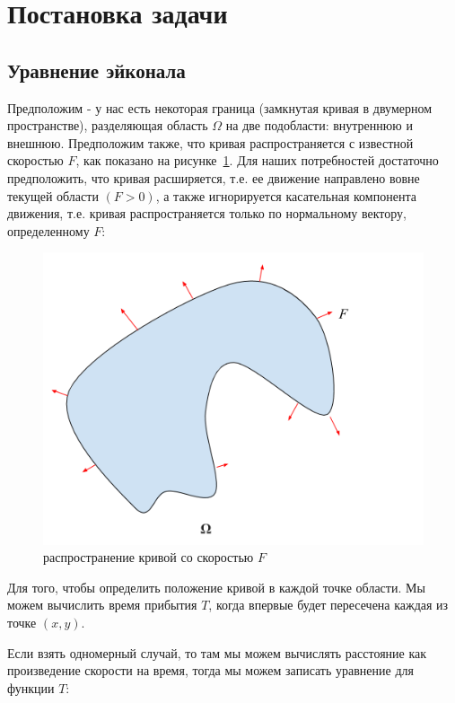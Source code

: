\section{Постановка задачи}
\label{sec:theory}

\subsection {Уравнение эйконала}
\label{sec:csdisttrack}

Предположим - у нас есть некоторая граница (замкнутая кривая в
двумерном пространстве), разделяющая область $\Omega$ на две подобласти:
внутреннюю и внешнюю. Предположим также, что кривая распространяется с
известной скоростью $F$, как показано на рисунке~\ref{fig:eikvis}. Для наших
потребностей достаточно предположить, что кривая расширяется, т.е. ее
движение направлено вовне текущей области $(F>0)$, а также
игнорируется касательная компонента движения, т.е. кривая
распространяется только по нормальному вектору, определенному $F$:

\begin{figure}[h]
  \centering
  \includegraphics[width=0.5\linewidth]{img/eikonal_vision.png}
  \hfil \caption{распространение кривой со скоростью $F$}
  \label{fig:eikvis}

\end{figure}


Для того, чтобы определить положение кривой в каждой точке области. Мы
можем вычислить время прибытия $T$, когда впервые будет пересечена
каждая из точке $(x,y)$.

Если взять одномерный случай, то там мы можем вычислять расстояние как
произведение скорости на время, тогда мы можем записать уравнение для
функции $T$:

